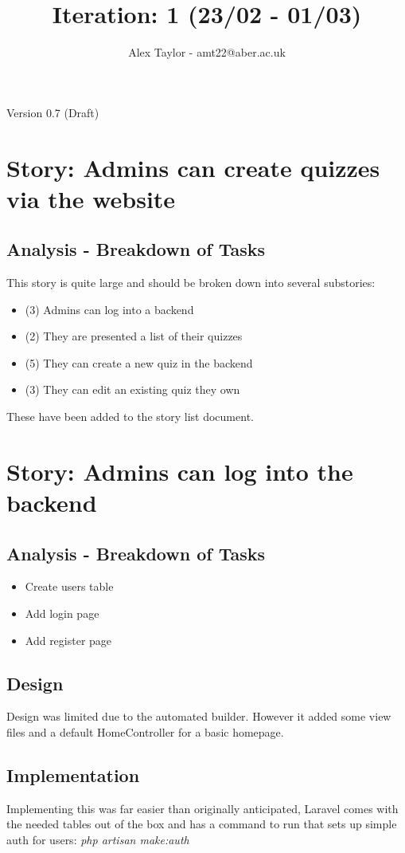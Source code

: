 \documentclass{article}
\title{Iteration: 1 (23/02 - 01/03)}
\author{Alex Taylor - amt22@aber.ac.uk}
\begin{document}
\maketitle
\begin{center}
	Version 0.7 (Draft)
\end{center}
\tableofcontents
\thispagestyle{empty}
\newpage

\section{Story: Admins can create quizzes via the website}
\subsection{Analysis - Breakdown of Tasks}
This story is quite large and should be broken down into several substories:
\begin{itemize}
	\item (3) Admins can log into a backend
	\item (2) They are presented a list of their quizzes
	\item (5) They can create a new quiz in the backend
	\item (3) They can edit an existing quiz they own
\end{itemize}
These have been added to the story list document.
\newpage

\section{Story: Admins can log into the backend}
\subsection{Analysis - Breakdown of Tasks}
\begin{itemize}
	\item Create users table
	\item Add login page
	\item Add register page
\end{itemize}
\subsection{Design}
Design was limited due to the automated builder. However it added some view files and a default HomeController for a basic homepage.
\subsection{Implementation}
Implementing this was far easier than originally anticipated, Laravel comes with the needed tables out of the box and has a command to run that sets up simple auth for users: \textit{php artisan make:auth}
\end{document}
